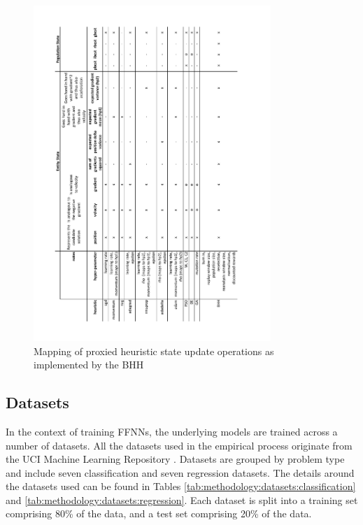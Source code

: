 \documentclass[preprint,review,12pt]{elsarticle}
\begin{document}
\begin{figure}[htbp]
	\centering
	\includegraphics[width=0.8\textwidth]{bhh_heuristic_proxies.pdf}
	\caption{Mapping of proxied heuristic state update operations as implemented by the \acs{BHH}}
	\label{fig:methodology:heuristics:proxies}%
\end{figure}


\subsection{Datasets}\label{sec:methodology:datasets}

In the context of training \acp{FFNN}, the underlying models are trained across a number of datasets. All the datasets used in the empirical process originate from the UCI Machine Learning Repository \citep{ref:uci:2022}. Datasets are grouped by problem type and include seven classification and seven regression datasets. The details around the datasets used can be found in Tables \ref{tab:methodology:datasets:classification} and \ref{tab:methodology:datasets:regression}. Each dataset is split into a training set comprising 80\% of the data, and a test set comprising 20\% of the data.
\end{document}
